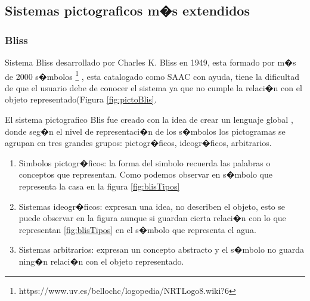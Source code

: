 \subsection{Sistemas pictograficos m�s extendidos}

\label{cap2:sec:Sistemas pictograficos m�s extendidos}

\subsubsection{Bliss}

Sistema Bliss desarrollado por Charles K. Bliss en 1949, esta formado por m�s de 2000 s�mbolos \footnote{https://www.uv.es/bellochc/logopedia/NRTLogo8.wiki?6} , esta catalogado como SAAC con ayuda, tiene la dificultad de que el usuario debe de conocer el sistema ya que no cumple la relaci�n con el objeto representado(Figura \ref{fig:pictoBlis}.

El sistema pictografico Blis fue creado con la idea de crear un lenguaje global \citep{Eugene1985}, donde seg�n el nivel de representaci�n de los s�mbolos los pictogramas se agrupan en tres grandes grupos: pictogr�ficos, ideogr�ficos, arbitrarios.

\begin{enumerate}
	
	\item Simbolos pictogr�ficos: la forma del simbolo recuerda las palabras o conceptos que representan. Como podemos observar en s�mbolo que representa la casa en la figura \ref{fig:blisTipos}
	
	\item Sistemas ideogr�ficos: expresan una idea, no describen el objeto, esto se puede observar en la figura aunque si guardan cierta relaci�n con lo que representan \ref{fig:blisTipos} en el s�mbolo que representa el agua.
	
	\item Sistemas arbitrarios: expresan un concepto abstracto y el s�mbolo no guarda ning�n relaci�n con el objeto representado.

\end{enumerate}



